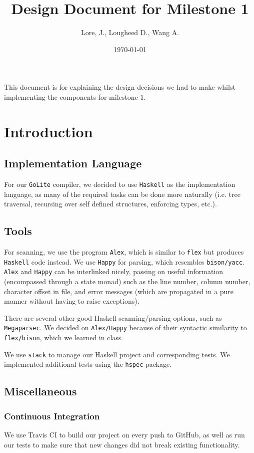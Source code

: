 \documentclass[11pt]{article}
\author{Lore, J., Lougheed D., Wang A.}
\date{\today}
\title{Design Document for Milestone 1}
\begin{document}
\maketitle
\tableofcontents

This document is for explaining the design decisions we had to make
whilst implementing the components for milestone 1.
\section{Introduction}
\label{sec:orgde16c5b}
\subsection{Implementation Language}
\label{sec:orgefcd8e3}
For our \texttt{GoLite} compiler, we decided to use \texttt{Haskell} as the
implementation language, as many of the required tasks can be done
more naturally (i.e. tree traversal, recursing over self defined
structures, enforcing types, etc.).
\subsection{Tools}
\label{sec:org9ee18de}
For scanning, we use the program \texttt{Alex}, which is similar to \texttt{flex}
but produces \texttt{Haskell} code instead. We use \texttt{Happy} for parsing,
which resembles \texttt{bison/yacc}. \texttt{Alex} and \texttt{Happy} can be interlinked
nicely, passing on useful information (encompassed through a state monad)
such as the line number, column number, character offset in file, and
error messages (which are propagated in a pure manner
without having to raise exceptions).

There are several other good Haskell scanning/parsing options, such as
\texttt{Megaparsec}. We decided on \texttt{Alex/Happy} because of their syntactic
similarity to \texttt{flex/bison}, which we learned in class.

We use \texttt{stack} to manage our Haskell project and corresponding tests.
We implemented additional tests using the \texttt{hspec} package.
\subsection{Miscellaneous}
\label{sec:orgc315ac5}
\subsubsection{Continuous Integration}
\label{sec:org4793bbe}
We use Travis CI to build our project on every push to GitHub, as well as
run our tests to make sure that new changes did not break
existing functionality.
\end{document}
